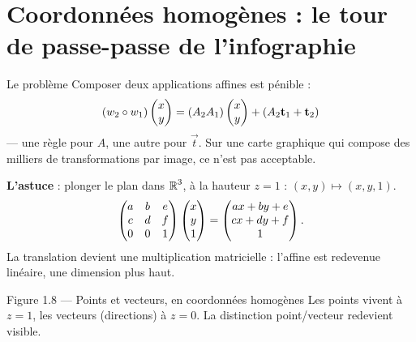 \section{Coordonnées homogènes : le tour de passe-passe de l'infographie}

\begin{frame}{Le problème}
  \small Composer deux applications affines est pénible :
  \[
    (w_2\circ w_1)\begin{pmatrix}x\\ y\end{pmatrix} = (A_2A_1)\begin{pmatrix}x\\ y\end{pmatrix} + (A_2\mathbf{t}_1+\mathbf{t}_2)
  \]
  --- une règle pour $A$, une autre pour $\vec t$. Sur une carte
  graphique qui compose des milliers de transformations par image, ce
  n'est pas acceptable.

  \vspace{6pt}
  \textbf{L'astuce} : plonger le plan dans $\operatorname{\mathbb{R}}^3$, à la hauteur $z=1$ :
  $(x,y) \mapsto (x,y,1)$.
  \[
    \begin{pmatrix} a & b & e\\ c & d & f\\ 0 & 0 & 1\end{pmatrix}
    \begin{pmatrix}x\\ y\\ 1\end{pmatrix} = \begin{pmatrix}ax+by+e\\ cx+dy+f\\ 1\end{pmatrix}.
  \]
  La translation devient une multiplication matricielle : l'affine est
  redevenue linéaire, une dimension plus haut.
\end{frame}

\begin{frame}{Figure 1.8 --- Points et vecteurs, en coordonnées homogènes}
  \small Les points vivent à $z=1$, les vecteurs (directions) à $z=0$.
  La distinction point/vecteur redevient visible.
\end{frame}

